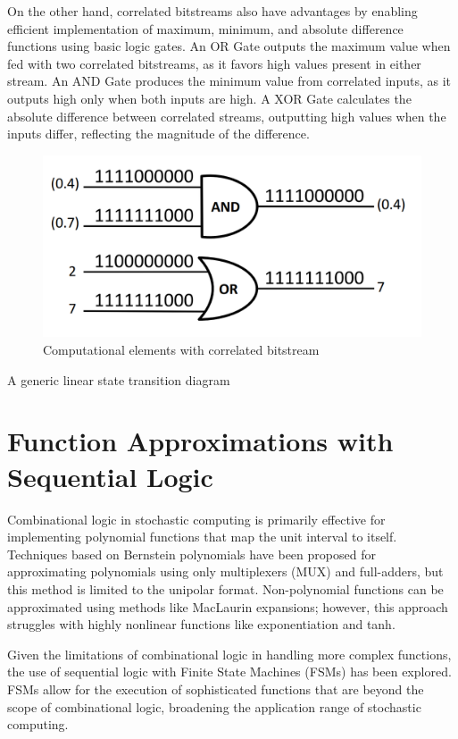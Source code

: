 On the other hand, correlated bitstreams also have advantages by enabling efficient implementation of maximum, minimum, and absolute difference functions using basic logic gates. An OR Gate outputs the maximum value when fed with two correlated bitstreams, as
it favors high values present in either stream. An AND Gate produces the minimum value from correlated inputs, as it outputs high only when
both inputs are high. A XOR Gate calculates the absolute
difference between correlated streams, outputting high values when the inputs
differ, reflecting the magnitude of the difference.


\begin{figure}[htb]
	\includegraphics[width=12cm]{gfx/maxmin.png}
	\caption{Computational elements with correlated bitstream}
	\label{fig:system:example1}
\end{figure}

A generic linear state transition diagram


\section{Function Approximations with Sequential Logic}
\label{sec:review:sec4}

Combinational logic in stochastic computing is primarily effective for implementing polynomial functions that map the unit interval to itself. 
Techniques based on Bernstein polynomials have been proposed for approximating
polynomials using only multiplexers (MUX) and full-adders, but this method
is limited to the unipolar format. Non-polynomial functions can be approximated using methods like MacLaurin expansions; however, this approach struggles with highly nonlinear functions like exponentiation and tanh.

Given the limitations of combinational logic in handling more complex functions, the use of sequential logic with Finite State Machines (FSMs) has been explored. FSMs allow for the execution of sophisticated functions that are beyond the scope of combinational logic, broadening the application range of stochastic computing.


